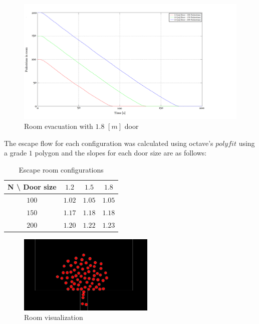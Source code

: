\documentclass[english]{article}
\providecommand{\tabularnewline}{\\}
\begin{document}
    \begin{figure}[H]
        \begin{centering}
        \includegraphics[scale=0.2]{pics/flow/18door} 
        \par\end{centering}
        \caption{\label{fig:room-flow-200}Room evacuation with $1.8$ $[m]$ door}
    \end{figure}
    
    The escape flow for each configuration was calculated using octave's $polyfit$ using a 
    grade $1$ polygon and the slopes for each door size are as follows:

    \begin{table}[H]
        \begin{centering}
        \begin{tabular}{|c|c|c|c|}
        \hline 
        N \textbackslash{} Door size & $1.2$ & $1.5$ & $1.8$\tabularnewline
        \hline 
        \hline 
        $100$ & $1.02$ & $1.05$ & $1.05$\tabularnewline
        \hline 
        $150$ & $1.17$ & $1.18$ & $1.18$\tabularnewline
        \hline 
        $200$ & $1.20$ & $1.22$ & $1.23$\tabularnewline
        \hline 
        \end{tabular}
        \caption{Escape room configurations \label{tbl:room-runs}}
        \end{centering}
    \end{table}

    \begin{figure}[H]
        \begin{centering}
        \includegraphics[width=6.5cm]{pics/program/room-no-future} 
        \par\end{centering}
        
        \caption{\label{fig:room-no-future} Room visualization}
    \end{figure}
    
\end{document}
